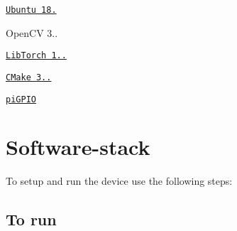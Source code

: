 
\begin{DoxyItemize}
\item \href{https://www.instructables.com/Install-Ubuntu-18044-LTS-on-Your-Raspberry-Pi-Boar/}{\tt Ubuntu 18.}
\item Open\+CV 3..
\item \href{https://download.pytorch.org/libtorch/nightly/cpu/libtorch-shared-with-deps-latest.zip}{\tt Lib\+Torch 1..}
\item \href{https://askubuntu.com/questions/355565/how-do-i-install-the-latest-version-of-cmake-from-the-command-line}{\tt C\+Make 3..}
\item \href{https://abyz.me.uk/rpi/pigpio/download.html}{\tt pi\+G\+P\+IO}
\end{DoxyItemize}

\section*{Software-\/stack}

To setup and run the device use the following steps\+:

\subsection*{To run}


